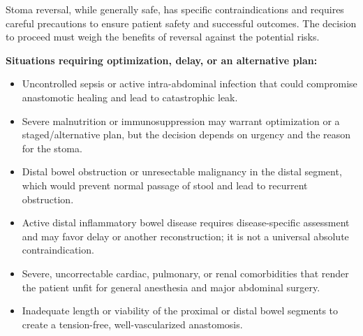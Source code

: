 Stoma reversal, while generally safe, has specific contraindications and requires careful precautions to ensure patient safety and successful outcomes. The decision to proceed must weigh the benefits of reversal against the potential risks.

\textbf{Situations requiring optimization, delay, or an alternative plan:}
\begin{itemize}
  \item Uncontrolled sepsis or active intra-abdominal infection that could compromise anastomotic healing and lead to catastrophic leak.
  
  \item Severe malnutrition or immunosuppression may warrant optimization or a staged/alternative plan, but the decision depends on urgency and the reason for the stoma.
  
  \item Distal bowel obstruction or unresectable malignancy in the distal segment, which would prevent normal passage of stool and lead to recurrent obstruction.
  
  \item Active distal inflammatory bowel disease requires disease-specific assessment and may favor delay or another reconstruction; it is not a universal absolute contraindication.
  
  \item Severe, uncorrectable cardiac, pulmonary, or renal comorbidities that render the patient unfit for general anesthesia and major abdominal surgery.
  
  \item Inadequate length or viability of the proximal or distal bowel segments to create a tension-free, well-vascularized anastomosis.
\end{itemize}

